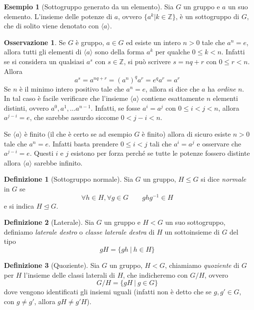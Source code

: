 \documentclass[11pt]{article}
\theoremstyle{plain}
\theoremstyle{definition}
\newtheorem{defn}{Definizione}[section]
\newtheorem{exmp}{Esempio}[section]
\newtheorem*{rem}{Osservazione}
\theoremstyle{remark}
\newcommand{\Z}{\mathbb{Z}}
\begin{document}
\begin{exmp}[Sottogruppo generato da un elemento]
Sia $G$ un gruppo e $a$ un suo elemento. L'insieme delle potenze di $a$, ovvero $\{a^k | k\in\Z\}$, è un sottogruppo di $G$,
che di solito viene denotato con $\langle a\rangle$.
\end{exmp}

\begin{rem}
Se $G$ è gruppo, $a\in G$ ed esiste un intero $n>0$ tale che $a^n=e$, allora tutti gli elementi di $\langle a\rangle$ sono della forma
$a^k$ per qualche $0\le k < n$. Infatti se si considera un qualsiasi $a^s$ con $s\in\Z$, si può scrivere $s=nq+r$ con $0\le r<n$.
Allora \[a^s=a^{nq+r} = (a^n)^qa^r = e^qa^r = a^r\]
Se $n$ è il minimo intero positivo tale che $a^n=e$, allora si dice che $a$ ha \emph{ordine} $n$. In tal caso è facile verificare che
l'insieme $\langle a\rangle$ contiene esattamente $n$ elementi distinti, ovvero $a^0, a^1, \dots a^{n-1}$.
Infatti, se fosse $a^i=a^j$ con $0\le i<j<n$, allora $a^{j-i}=e$, che sarebbe assurdo siccome $0<j-i<n$.

Se $\langle a\rangle$ è finito (il che è certo se ad esempio $G$ è finito) allora di sicuro esiste $n>0$ tale che $a^n=e$. Infatti basta prendere $0\le i < j$
tali che $a^i = a^j$ e osservare che $a^{j-i} = e$. Questi $i$ e $j$ esistono per forza perché se tutte le potenze fossero distinte allora $\langle a\rangle$ sarebbe infinito.
\end{rem}


\begin{defn}[Sottogruppo normale]
Sia $G$ un gruppo, $H \leq G$ si dice \emph{normale} in $G$ se
\[
	\forall h\in H, \forall g\in G\qquad ghg^{-1}\in H
\]
e si indica $H \trianglelefteq G$.
\end{defn}

\begin{defn}[Laterale]
	Sia $G$ un gruppo e $H<G$ un suo sottogruppo, definiamo \textit{laterale destro} o \textit{classe laterale destra} di $H$
	un sottoinsieme di $G$ del tipo
	\[
		gH=\{ gh\ |\ h\in H\}
	\]
\end{defn}

\begin{defn}[Quoziente]\label{defn:quoziente}
	Sia $G$ un gruppo, $H<G$, chiamiamo \textit{quoziente} di $G$ per $H$ l'insieme delle classi laterali di $H$, che indicheremo con $G/H$, ovvero
	\[
		G/H=\{gH\ |\ g\in G\}
	\]
	dove vengono identificati gli insiemi uguali (infatti non è detto che se $g,g'\in G$, con $g\neq g'$, allora $gH\neq g'H$).
\end{defn}
\end{document}

